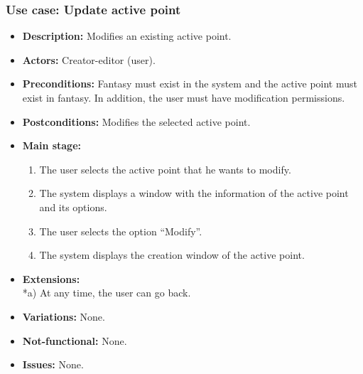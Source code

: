 \subsubsection{Use case: Update active point}
\begin{itemize}
	\item \textbf{Description:} Modifies an existing active point.
	\item \textbf{Actors:} Creator-editor (user).
	\item \textbf{Preconditions:} Fantasy must exist in the system and the active point must exist in fantasy. In addition, the user must have modification permissions.
	\item \textbf{Postconditions:} Modifies the selected active point.
	\item \textbf{Main stage:}
	\begin{enumerate}
		\item The user selects the active point that he wants to modify.
		\item The system displays a window with the information of the active point and its options.
		\item The user selects the option ``Modify''.
		\item The system displays the creation window of the active point.
	\end{enumerate}
	\item \textbf{Extensions:} \\ *a) At any time, the user can go back.
	\item \textbf{Variations:} None.
	\item \textbf{Not-functional:} None.
	\item \textbf{Issues:} None.
\end{itemize}

